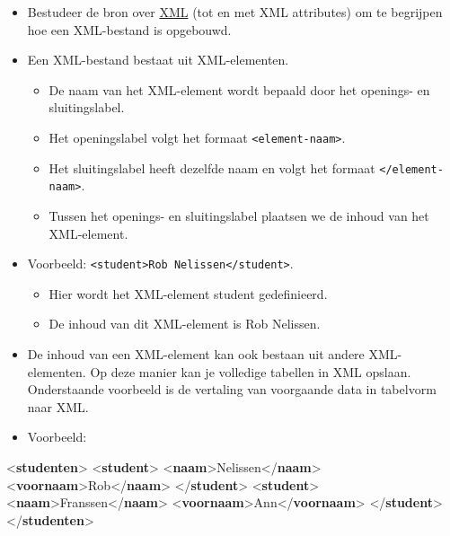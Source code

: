 \documentclass[]{tufte-book}
\newenvironment{Shaded}{}{}
\newcommand{\KeywordTok}[1]{\textcolor[rgb]{0.00,0.44,0.13}{\textbf{#1}}}
\newcommand{\NormalTok}[1]{#1}
\providecommand{\tightlist}{%
  \setlength{\itemsep}{0pt}\setlength{\parskip}{0pt}}
\begin{document}
\begin{itemize}
\tightlist
\item
  Bestudeer de bron over \href{https://www.w3schools.com/xml/default.asp}{XML} (tot en met XML attributes) om te begrijpen hoe een XML-bestand is opgebouwd.
\item
  Een XML-bestand bestaat uit XML-elementen.

  \begin{itemize}
  \tightlist
  \item
    De naam van het XML-element wordt bepaald door het openings- en sluitingslabel.
  \item
    Het openingslabel volgt het formaat \texttt{\textless{}element-naam\textgreater{}}.
  \item
    Het sluitingslabel heeft dezelfde naam en volgt het formaat \texttt{\textless{}/element-naam\textgreater{}}.
  \item
    Tussen het openings- en sluitingslabel plaatsen we de inhoud van het XML-element.
  \end{itemize}
\item
  Voorbeeld: \texttt{\textless{}student\textgreater{}Rob\ Nelissen\textless{}/student\textgreater{}}.

  \begin{itemize}
  \tightlist
  \item
    Hier wordt het XML-element student gedefinieerd.
  \item
    De inhoud van dit XML-element is Rob Nelissen.
  \end{itemize}
\item
  De inhoud van een XML-element kan ook bestaan uit andere XML-elementen. Op deze manier kan je volledige tabellen in XML opslaan. Onderstaande voorbeeld is de vertaling van voorgaande data in tabelvorm naar XML.
\item
  Voorbeeld:
\end{itemize}

\begin{Shaded}
\begin{Highlighting}[]
\NormalTok{\textless{}}\KeywordTok{studenten}\NormalTok{\textgreater{}}
\NormalTok{  \textless{}}\KeywordTok{student}\NormalTok{\textgreater{}}
\NormalTok{    \textless{}}\KeywordTok{naam}\NormalTok{\textgreater{}Nelissen\textless{}/}\KeywordTok{naam}\NormalTok{\textgreater{}}
\NormalTok{    \textless{}}\KeywordTok{voornaam}\NormalTok{\textgreater{}Rob\textless{}/}\KeywordTok{naam}\NormalTok{\textgreater{}}
\NormalTok{  \textless{}/}\KeywordTok{student}\NormalTok{\textgreater{}}
\NormalTok{  \textless{}}\KeywordTok{student}\NormalTok{\textgreater{}}
\NormalTok{    \textless{}}\KeywordTok{naam}\NormalTok{\textgreater{}Franssen\textless{}/}\KeywordTok{naam}\NormalTok{\textgreater{}}
\NormalTok{    \textless{}}\KeywordTok{voornaam}\NormalTok{\textgreater{}Ann\textless{}/}\KeywordTok{voornaam}\NormalTok{\textgreater{}}
\NormalTok{  \textless{}/}\KeywordTok{student}\NormalTok{\textgreater{}}
\NormalTok{\textless{}/}\KeywordTok{studenten}\NormalTok{\textgreater{}}
\end{Highlighting}
\end{Shaded}
\end{document}
